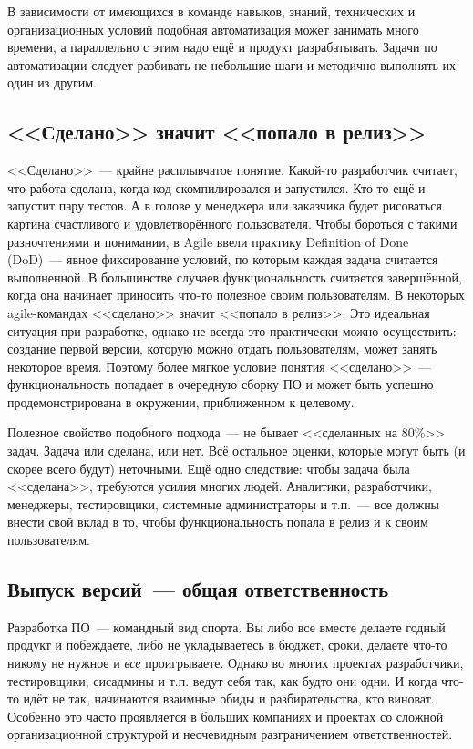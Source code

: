 \documentclass{../../text-style}
\begin{document}
В зависимости от имеющихся в команде навыков, знаний, технических и организационных условий подобная автоматизация может занимать много времени, а параллельно с этим надо ещё и продукт разрабатывать. Задачи по автоматизации следует разбивать не небольшие шаги и методично выполнять их один из другим.

\subsection{<<Сделано>> значит <<попало в релиз>>}

<<Сделано>>~--- крайне расплывчатое понятие. Какой-то разработчик считает, что работа сделана, когда код скомпилировался и запустился. Кто-то ещё и запустит пару тестов. А в голове у менеджера или заказчика будет рисоваться картина счастливого и удовлетворённого пользователя. Чтобы бороться с такими разночтениями и понимании, в Agile ввели практику Definition of Done (DoD)~--- явное фиксирование условий, по которым каждая задача считается выполненной. В большинстве случаев функциональность считается завершённой, когда она начинает приносить что-то полезное своим пользователям. В некоторых agile-командах <<сделано>> значит <<попало в релиз>>. Это идеальная ситуация при разработке, однако не всегда это практически можно осуществить: создание первой версии, которую можно отдать пользователям, может занять некоторое время. Поэтому более мягкое условие понятия <<сделано>>~--- функциональность попадает в очередную сборку ПО и может быть успешно продемонстрирована в окружении, приближенном к целевому.

Полезное свойство подобного подхода~--- не бывает <<сделанных на 80\%>> задач. Задача или сделана, или нет. Всё остальное оценки, которые могут быть (и скорее всего будут) неточными. Ещё одно следствие: чтобы задача была <<сделана>>, требуются усилия многих людей. Аналитики, разработчики, менеджеры, тестировщики, системные администраторы и т.п.~--- все должны внести свой вклад в то, чтобы функциональность попала в релиз и к своим пользователям.

\subsection{Выпуск версий~--- общая ответственность}

Разработка ПО~--- командный вид спорта. Вы либо все вместе делаете годный продукт и побеждаете, либо не укладываетесь в бюджет, сроки, делаете что-то никому не нужное и \emph{все} проигрываете. Однако во многих проектах разработчики, тестировщики, сисадмины и т.п. ведут себя так, как будто они одни. И когда что-то идёт не так, начинаются взаимные обиды и разбирательства, кто виноват. Особенно это часто проявляется в больших компаниях и проектах со сложной организационной структурой и неочевидным разграничением ответственностей.
\end{document}
